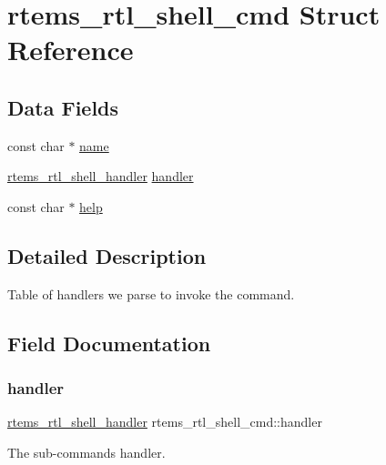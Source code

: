 \hypertarget{structrtems__rtl__shell__cmd}{}\section{rtems\+\_\+rtl\+\_\+shell\+\_\+cmd Struct Reference}
\label{structrtems__rtl__shell__cmd}
\subsection*{Data Fields}
\begin{DoxyCompactItemize}
\item 
const char $\ast$ \mbox{\hyperlink{structrtems__rtl__shell__cmd_ab996e376e48557408360700f3c75f0a2}{name}}
\item 
\mbox{\hyperlink{rtl-shell_8c_abdb8a1e1d10a86732342e0157986f7ff}{rtems\+\_\+rtl\+\_\+shell\+\_\+handler}} \mbox{\hyperlink{structrtems__rtl__shell__cmd_a56719cc746158e9e9cbdd1a38e104ffa}{handler}}
\item 
const char $\ast$ \mbox{\hyperlink{structrtems__rtl__shell__cmd_a4de7d8b1fa8087513e4c7cccef26a831}{help}}
\end{DoxyCompactItemize}


\subsection{Detailed Description}
Table of handlers we parse to invoke the command. 

\subsection{Field Documentation}
\mbox{\label{structrtems__rtl__shell__cmd_a56719cc746158e9e9cbdd1a38e104ffa}} 
\subsubsection{\texorpdfstring{handler}{handler}}
{\footnotesize\ttfamily \mbox{\hyperlink{rtl-shell_8c_abdb8a1e1d10a86732342e0157986f7ff}{rtems\+\_\+rtl\+\_\+shell\+\_\+handler}} rtems\+\_\+rtl\+\_\+shell\+\_\+cmd\+::handler}

The sub-\/command\textquotesingle{}s handler. \mbox{\label{structrtems__rtl__shell__cmd_a4de7d8b1fa8087513e4c7cccef26a831}} 
